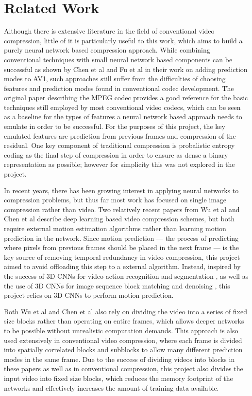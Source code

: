 \documentclass[10pt,twocolumn,letterpaper]{article}
\begin{document}
\section{Related Work}
Although there is extensive literature in the field of conventional video compression, little of it is particularly useful to this work, which aims to build a purely neural network based compression approach. While combining conventional techniques with small neural network based components can be successful as shown by Chen et al \cite{av1improv1} and Fu et al \cite{av1improv2} in their work on adding prediction modes to AV1, such approaches still suffer from the difficulties of choosing features and prediction modes found in conventional codec development. The original paper describing the MPEG codec \cite{LeGall} provides a good reference for the basic techniques still employed by most conventional video codecs, which can be seen as a baseline for the types of features a neural network based approach needs to emulate in order to be successful. For the purposes of this project, the key emulated features are prediction from previous frames and compression of the residual. One key component of traditional compression is probalistic entropy coding as the final step of compression in order to ensure as dense a binary representation as possible; however for simplicity this was not explored in the project.

In recent years, there has been growing interest in applying neural networks to compression problems, but thus far most work has focused on single image compression rather than video. Two relatively recent papers from Wu et al \cite{DBLP:journals/corr/abs-1804-06919} and Chen et al \cite{DBLP:journals/corr/abs-1804-09869} describe deep learning based video compression schemes, but both require external motion estimation algorithms rather than learning motion prediction in the network. Since motion prediction --- the process of predicting where pixels from previous frames should be placed in the next frame --- is the key source of removing temporal redundancy in video compression, this project aimed to avoid offloading this step to a external algorithm. Instead, inspired by the success of 3D CNNs for video action recognition and segmentation \cite{DBLP:journals/corr/abs-1712-01111}, as well as the use of 3D CNNs for image sequence block matching and denoising \cite{DBLP:journals/corr/AhnC17}, this project relies on 3D CNNs to perform motion prediction.

Both Wu et al and Chen et al also rely on dividing the video into a series of fixed size blocks rather than operating on entire frames, which allows deeper networks to be possible without unrealistic computation demands. This approach is also used extensively in conventional video compression, where each frame is divided into spatially correlated blocks and subblocks to allow many different prediction modes in the same frame. Due to the success of dividing videos into blocks in these papers as well as in conventional compression, this project also divides the input video into fixed size blocks, which reduces the memory footprint of the networks and effectively increases the amount of training data available.
\end{document}
